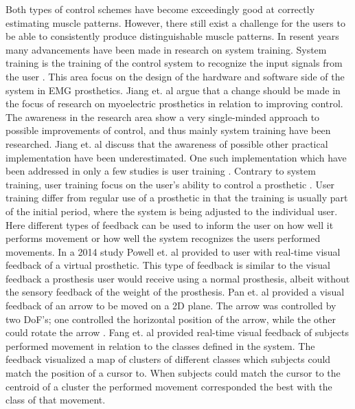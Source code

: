 Both types of control schemes have become exceedingly good at correctly estimating muscle patterns. \cite{Hahne2014, Bruun2017, Englehart2003, Scheme2015} However, there still exist a challenge for the users to be able to consistently produce distinguishable muscle patterns. \cite{Powell2014} In resent years many advancements have been made in research on system training. System training is the training of the control system to recognize the input signals from the user \cite{Fougner2012}. This area focus on the design of the hardware and software side of the system in EMG prosthetics. Jiang et. al \cite{Jiang2012} argue that a change should be made in the focus of research on myoelectric prosthetics in relation to improving control. The awareness in the research area show a very single-minded approach to possible improvements of control, and thus mainly system training have been researched. Jiang et. al \cite{Jiang2012} discuss that the awareness of possible other practical implementation have been underestimated. One such implementation which have been addressed in only a few studies is user training \cite{Fang2017, Powell2014, Pan2017}. Contrary to system training, user training focus on the user's ability to control a prosthetic \cite{Founer2012}. User training differ from regular use of a prosthetic in that the training is usually part of the initial period, where the system is being adjusted to the individual user. Here different types of feedback can be used to inform the user on how well it performs movement or how well the system recognizes the users performed movements. In a 2014 study Powell et. al \cite{Powell2014} provided to user with real-time visual feedback of a virtual prosthetic. This type of feedback is similar to the visual feedback a prosthesis user would receive using a normal prosthesis, albeit without the sensory feedback of the weight of the prosthesis. Pan et. al \cite{Pan2017} provided a visual feedback of an arrow to be moved on a 2D plane. The arrow was controlled by two DoF's; one controlled the horizontal position of the arrow, while the other could rotate the arrow \cite{Pan2017}. Fang et. al \cite{Fang2017} provided real-time visual feedback of subjects performed movement in relation to the classes defined in the system. The feedback visualized a map of clusters of different classes which subjects could match the position of a cursor to. When subjects could match the cursor to the centroid of a cluster the performed movement corresponded the best with the class of that movement. \cite{Fang2017} 
 
